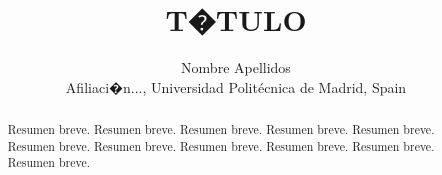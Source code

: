 \documentclass{article}
\begin{document}
\title{T�TULO}

\author{{Nombre Apellidos}\\
{\small Afiliaci�n..., Universidad Polit\'ecnica de Madrid, Spain}}

\date{}
\maketitle



\begin{abstract} Resumen breve. Resumen breve. Resumen breve. Resumen breve. Resumen breve. Resumen breve. Resumen breve. Resumen breve. Resumen breve. Resumen breve. Resumen breve.
\end{abstract}












\end{document}
